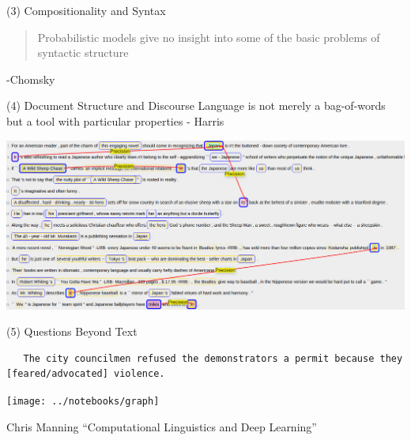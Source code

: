 \documentclass{beamer}
\begin{document}
\begin{frame}{(3) Compositionality and Syntax}
  \begin{quote}
    Probabilistic models give no insight into some of the basic
    problems of syntactic structure 
  \end{quote} -Chomsky

\end{frame}

\begin{frame}{(4) Document Structure and Discourse}
  Language is not merely a bag-of-words but a tool with particular properties - Harris  
  \begin{center}
    \includegraphics[width=\textwidth]{cort}
  \end{center}
\end{frame}

\begin{frame}{(5) Questions Beyond Text}
\begin{verbatim}
   The city councilmen refused the demonstrators a permit because they [feared/advocated] violence.
\end{verbatim}
\end{frame}

\begin{frame}
  \vspace{-5cm}
  
  \hspace*{-2cm}
  \texttt{[image: ../notebooks/graph]}
\end{frame}

\begin{frame}
  

  
\end{frame}

\begin{frame}
  Chris Manning ``Computational Linguistics and Deep Learning''
\end{frame}
\end{document}
